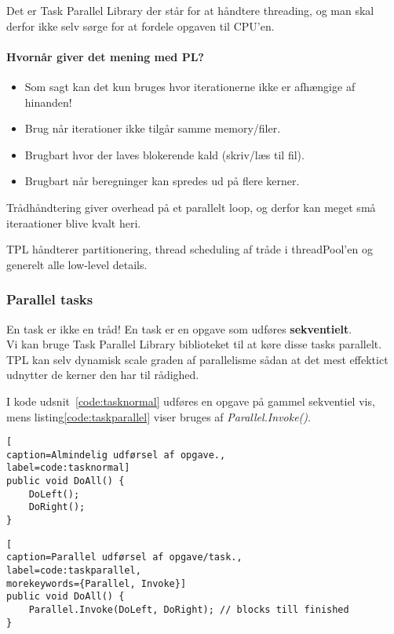 Det er Task Parallel Library der står for at håndtere threading, og man skal derfor ikke selv sørge for at fordele opgaven til CPU'en. 

\paragraph{Hvornår giver det mening med PL?}
\begin{itemize}
	\item Som sagt kan det kun bruges hvor iterationerne ikke er afhængige af hinanden!
	\item Brug når iterationer ikke tilgår samme memory/filer.
	\item Brugbart hvor der laves blokerende kald (skriv/læs til fil).
	\item Brugbart når beregninger kan spredes ud på flere kerner.
\end{itemize}

Trådhåndtering giver overhead på et parallelt loop, og derfor kan meget små iteraationer blive kvalt heri.

TPL håndterer partitionering, thread scheduling af tråde i threadPool'en og generelt alle low-level details.

\subsubsection{Parallel tasks}

En task er ikke en tråd! En task er en opgave som udføres \textbf{sekventielt}.\\

Vi kan bruge Task Parallel Library biblioteket til at køre disse tasks parallelt. TPL kan selv dynamisk scale graden af parallelisme sådan at det mest effektict udnytter de kerner den har til rådighed.

I kode udsnit~\ref{code:tasknormal} udføres en opgave på gammel sekventiel vis, mens listing\ref{code:taskparallel} viser bruges af \textit{Parallel.Invoke()}.

\begin{lstlisting}[
caption=Almindelig udførsel af opgave.,
label=code:tasknormal]
public void DoAll() {
	DoLeft();
	DoRight();
}
\end{lstlisting}

\begin{lstlisting}[
caption=Parallel udførsel af opgave/task.,
label=code:taskparallel,
morekeywords={Parallel, Invoke}]
public void DoAll() {
	Parallel.Invoke(DoLeft, DoRight); // blocks till finished
}
\end{lstlisting}

